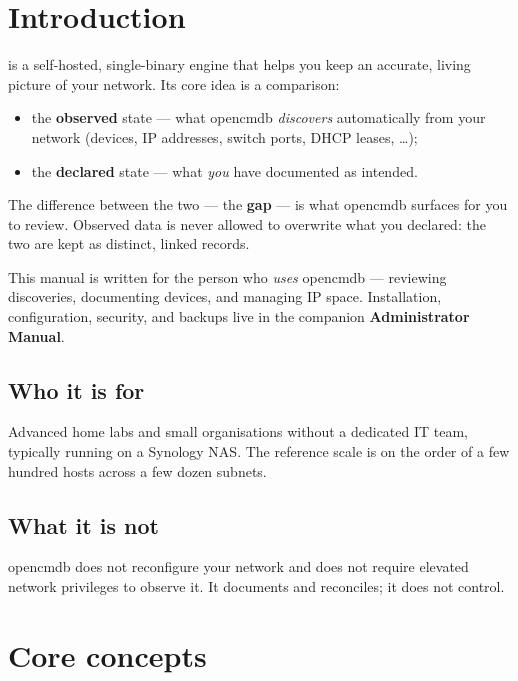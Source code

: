 \documentclass[11pt,oneside,listof=totoc,bibliography=totoc]{scrreprt}
\begin{document}

\tableofcontents

\chapter{Introduction}
\productname{} is a self-hosted, single-binary engine that helps you keep an accurate,
living picture of your network. Its core idea is a comparison:

\begin{itemize}
  \item the \textbf{observed} state — what opencmdb \emph{discovers} automatically from
        your network (devices, IP addresses, switch ports, DHCP leases, \ldots);
  \item the \textbf{declared} state — what \emph{you} have documented as intended.
\end{itemize}

The difference between the two — the \textbf{gap} — is what opencmdb surfaces for you to
review. Observed data is never allowed to overwrite what you declared: the two are kept as
distinct, linked records.

\begin{note}
This manual is written for the person who \emph{uses} opencmdb — reviewing discoveries,
documenting devices, and managing IP space. Installation, configuration, security, and
backups live in the companion \textbf{Administrator Manual}.
\end{note}

\section{Who it is for}
Advanced home labs and small organisations without a dedicated IT team, typically running
on a Synology NAS. The reference scale is on the order of a few hundred hosts across a few
dozen subnets.

\section{What it is not}
opencmdb does not reconfigure your network and does not require elevated network
privileges to observe it. It documents and reconciles; it does not control.

\chapter{Core concepts}
\end{document}
